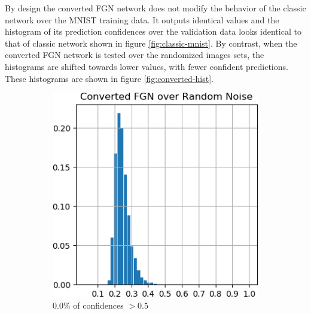 \documentclass[12pt,oneside]{CUNY_PhD}
\begin{document}
\newpage%

By design the converted FGN network does not modify the behavior of the classic network over the MNIST training data. It outputs identical values and the histogram of its prediction confidences over the validation data looks identical to that of classic network shown in figure \ref{fig:classic-mnist}. By contrast, when the converted FGN network is tested over the randomized images sets, the histograms are shifted towards lower values, with fewer confident predictions. These histograms are shown in figure \ref{fig:converted-hist}.
\begin{figure}[!h]
    \centering
    \begin{subfigure}[t]{0.49\textwidth}
        \includegraphics[width=\textwidth]{images/mnist-behavior/converted-hist-random.png}
        \caption*{0.0\% of confidences $>0.5$}
    \end{subfigure}
    \begin{subfigure}[t]{0.49\textwidth}

\end{subfigure}
\end{figure}
\end{document}
